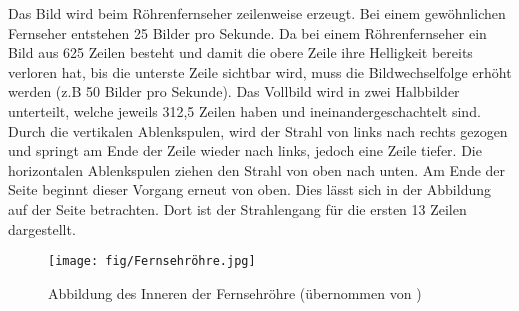 Das Bild wird beim Röhrenfernseher zeilenweise erzeugt.
Bei einem gewöhnlichen Fernseher entstehen 25 Bilder pro Sekunde.
Da bei einem Röhrenfernseher ein Bild aus 625 Zeilen besteht und damit die obere Zeile ihre Helligkeit bereits verloren hat, bis die unterste Zeile sichtbar wird, muss die Bildwechselfolge erhöht werden (z.B 50 Bilder pro Sekunde).
Das Vollbild wird in zwei Halbbilder unterteilt, welche jeweils 312,5 Zeilen haben und ineinandergeschachtelt sind.
Durch die vertikalen Ablenkspulen, wird der Strahl von links nach rechts gezogen und springt am Ende der Zeile wieder nach links, jedoch eine Zeile tiefer.
Die horizontalen Ablenkspulen ziehen den Strahl von oben nach  unten.
Am Ende der Seite beginnt dieser Vorgang erneut von oben.
Dies lässt sich in der Abbildung auf der Seite \cite{Roehrenfernsehr} betrachten.
Dort ist der Strahlengang für die ersten 13 Zeilen dargestellt.
\begin{figure}[h]
    \centering
    \texttt{[image: fig/Fernsehröhre.jpg]}
    \caption{Abbildung des Inneren der Fernsehröhre (übernommen von \cite{Abbildung}) }
    \label{fig:Fernsehroehre}
\end{figure}
